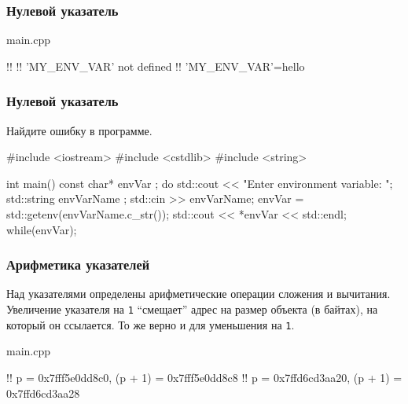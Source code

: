 \documentclass[compress, 8pt, aspectratio=169]{beamer}
\begin{document}
\begin{frame}[fragile]

    \frametitle{Нулевой указатель}

    \hfill \break

        {main.cpp}

    \begin{terminalwindow}
!!
!!
'MY_ENV_VAR' not defined
!!
'MY_ENV_VAR'=hello
    \end{terminalwindow}

\end{frame}

\begin{frame}[fragile]

    \frametitle{Нулевой указатель}

    \begin{task}
        Найдите ошибку в программе.
    \end{task}

    \begin{myinplacelisting}[minted language=cpp]
#include <iostream>
#include <cstdlib>
#include <string>

int main() {
    const char* envVar {};
    do {
        std::cout << "Enter environment variable: ";
        std::string envVarName {};
        std::cin >> envVarName;
        envVar = std::getenv(envVarName.c_str());
        std::cout << *envVar << std::endl;
    }
    while(envVar);
}
    \end{myinplacelisting}

\end{frame}

\begin{frame}[fragile]

    \frametitle{Арифметика указателей}

    \hfill \break

    Над указателями определены арифметические операции сложения и вычитания.
    Увеличение указателя на \verb|1| \enquote{смещает} адрес на размер объекта
    (в байтах), на который он ссылается.
    То же верно и для уменьшения на \verb|1|.

        {main.cpp}

    \begin{terminalwindow}
!!
p = 0x7fff5e0dd8c0, (p + 1) = 0x7fff5e0dd8c8
!!
p = 0x7ffd6cd3aa20, (p + 1) = 0x7ffd6cd3aa28
    \end{terminalwindow}

\end{frame}
\end{document}
